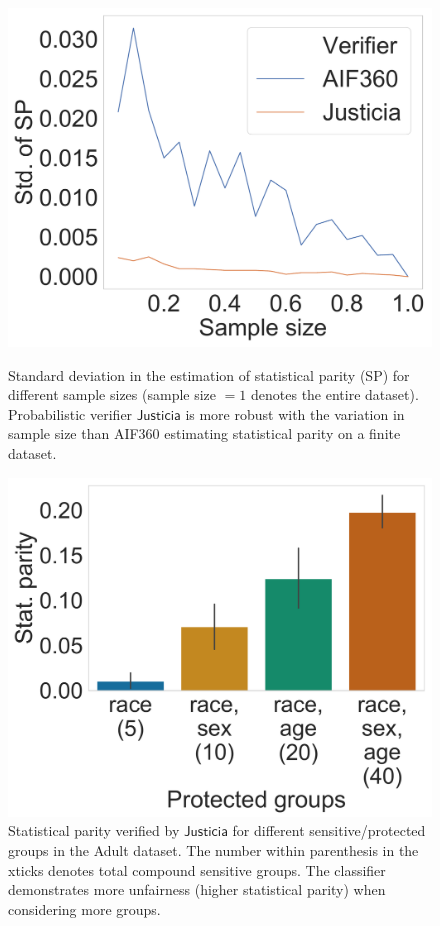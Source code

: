\documentclass{article}
\begin{document}
	
	\begin{figure}[t!]
		\begin{minipage}{0.45\textwidth}
			\centering
			\includegraphics[scale=.18]{figures/sampling_SPD_after_Adult_rw_LR_race.pdf}
			\caption{Standard deviation in the estimation of statistical parity (SP)  for different sample sizes (sample size $ = 1 $ denotes the entire dataset). Probabilistic verifier $ \mathsf{Justicia} $ is more robust with the variation in sample size than AIF360 estimating statistical parity on a finite dataset. }
			\label{fig:sample-size}
		\end{minipage}\hfill
		\begin{minipage}{0.48\textwidth}
			\centering
				\includegraphics[scale=.18]{figures/sensitive_attribute_race_spd_Adult_DT_RE.pdf}
			\caption{Statistical parity verified by $ \mathsf{Justicia} $ for different sensitive/protected groups in the Adult dataset. The number within parenthesis in the xticks denotes total compound sensitive groups. The classifier demonstrates more unfairness (higher statistical parity) when considering more groups.}
			\label{fig:protected_groups}
		\end{minipage}
	\end{figure}
	
\end{document}
